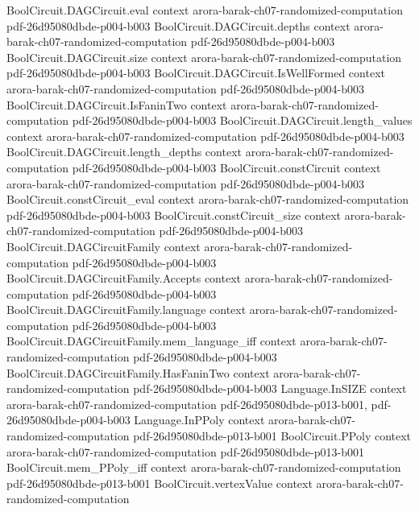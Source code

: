 \begin{theorem}
  {BoolCircuit.DAGCircuit.eval}
  {context}
  {arora-barak-ch07-randomized-computation}
  {pdf-26d95080dbde-p004-b003}
\proofstep
  {BoolCircuit.DAGCircuit.depths}
  {context}
  {arora-barak-ch07-randomized-computation}
  {pdf-26d95080dbde-p004-b003}
\proofstep
  {BoolCircuit.DAGCircuit.size}
  {context}
  {arora-barak-ch07-randomized-computation}
  {pdf-26d95080dbde-p004-b003}
\proofstep
  {BoolCircuit.DAGCircuit.IsWellFormed}
  {context}
  {arora-barak-ch07-randomized-computation}
  {pdf-26d95080dbde-p004-b003}
\proofstep
  {BoolCircuit.DAGCircuit.IsFaninTwo}
  {context}
  {arora-barak-ch07-randomized-computation}
  {pdf-26d95080dbde-p004-b003}
\proofstep
  {BoolCircuit.DAGCircuit.length_values}
  {context}
  {arora-barak-ch07-randomized-computation}
  {pdf-26d95080dbde-p004-b003}
\proofstep
  {BoolCircuit.DAGCircuit.length_depths}
  {context}
  {arora-barak-ch07-randomized-computation}
  {pdf-26d95080dbde-p004-b003}
\proofstep
  {BoolCircuit.constCircuit}
  {context}
  {arora-barak-ch07-randomized-computation}
  {pdf-26d95080dbde-p004-b003}
\proofstep
  {BoolCircuit.constCircuit_eval}
  {context}
  {arora-barak-ch07-randomized-computation}
  {pdf-26d95080dbde-p004-b003}
\proofstep
  {BoolCircuit.constCircuit_size}
  {context}
  {arora-barak-ch07-randomized-computation}
  {pdf-26d95080dbde-p004-b003}
\proofstep
  {BoolCircuit.DAGCircuitFamily}
  {context}
  {arora-barak-ch07-randomized-computation}
  {pdf-26d95080dbde-p004-b003}
\proofstep
  {BoolCircuit.DAGCircuitFamily.Accepts}
  {context}
  {arora-barak-ch07-randomized-computation}
  {pdf-26d95080dbde-p004-b003}
\proofstep
  {BoolCircuit.DAGCircuitFamily.language}
  {context}
  {arora-barak-ch07-randomized-computation}
  {pdf-26d95080dbde-p004-b003}
\proofstep
  {BoolCircuit.DAGCircuitFamily.mem_language_iff}
  {context}
  {arora-barak-ch07-randomized-computation}
  {pdf-26d95080dbde-p004-b003}
\proofstep
  {BoolCircuit.DAGCircuitFamily.HasFaninTwo}
  {context}
  {arora-barak-ch07-randomized-computation}
  {pdf-26d95080dbde-p004-b003}
\proofstep
  {Language.InSIZE}
  {context}
  {arora-barak-ch07-randomized-computation}
  {pdf-26d95080dbde-p013-b001,
    pdf-26d95080dbde-p004-b003}
\proofstep
  {Language.InPPoly}
  {context}
  {arora-barak-ch07-randomized-computation}
  {pdf-26d95080dbde-p013-b001}
\proofstep
  {BoolCircuit.PPoly}
  {context}
  {arora-barak-ch07-randomized-computation}
  {pdf-26d95080dbde-p013-b001}
\proofstep
  {BoolCircuit.mem_PPoly_iff}
  {context}
  {arora-barak-ch07-randomized-computation}
  {pdf-26d95080dbde-p013-b001}
\proofstep
  {BoolCircuit.vertexValue}
  {context}
  {arora-barak-ch07-randomized-computation}

\end{theorem}
